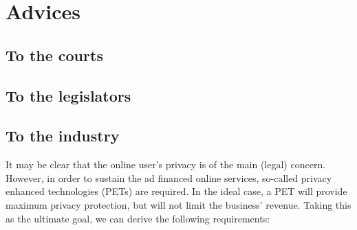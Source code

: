 \documentclass[11pt]{article}
\begin{document}




\section{Advices}
\label{advices}
\subsection{To the courts}
\subsection{To the legislators}
\subsection{To the industry}
It may be clear that the online user's privacy is of the main (legal) concern. However, in order to sustain the ad financed online services, so-called privacy enhanced technologies (PETs) are required. In the ideal case, a PET will provide maximum privacy protection, but will not limit the business' revenue. Taking this as the ultimate goal, we can derive the following requirements:
\end{document}
